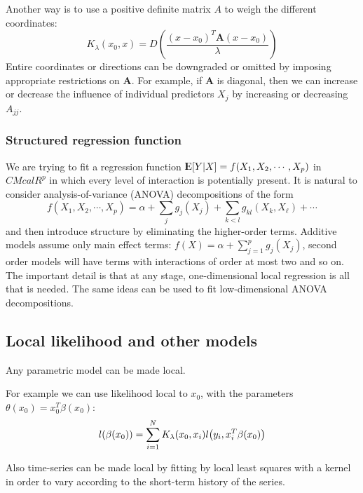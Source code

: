 \documentclass[12pt, letterpaper]{article}
\theoremstyle{definition}
\newcommand{\E}{{\rm I\kern-.3em E}}
\DeclarePairedDelimiter\autobracket{(}{)}
\newcommand{\br}[1]{\autobracket*{#1}}
\begin{document}
Another way is to use a positive definite matrix $A$ to weigh the different coordinates:
\begin{equation}
K_\lambda(x_0, x) = D\left( \frac{(x-x_0)^T\mathbf{A}(x-x_0)}{\lambda}\right)
\end{equation}
Entire coordinates or directions can be downgraded or omitted by imposing appropriate restrictions on $\mathbf{A}$. For example, if $\mathbf{A}$ is diagonal, then we can increase or decrease the influence of individual predictors $X_j$ by increasing or decreasing $A_{jj}$.

\subsubsection{Structured regression function}
We are trying to fit a regression function $\E[Y|X] =f(X_1,X_2, \cdots, X_p)$ in $CMcal{R}^p$ in which every level of interaction is potentially present. It is natural to consider analysis-of-variance (ANOVA) decompositions of the form
\begin{equation}
f(X_1,X_2,\cdots, X_p) = \alpha + \sum_j g_j(X_j) +  \sum_{k<l} g_{kl}(X_k, X_\ell) + \cdots 
\end{equation}
and then introduce structure by eliminating the higher-order terms. Additive models assume only main effect terms: $f(X) = \alpha + \sum_{j=1}^p g_j(X_j)$, second order models will have terms with interactions of order at most two and so on.  The important detail is that at any stage, one-dimensional local regression is all that is needed. The same ideas can be used to fit low-dimensional ANOVA decompositions.

\subsection{Local likelihood and other models}
Any parametric model can be made local.

For example we can use likelihood local to $x_0$,  with the parameters $\theta(x_0) = x_0^T\beta(x_0)$:
\begin{equation}
l\br{\beta(x_0)} = \sum_{i=1}^N K_\lambda (x_0,x_i) l\br{y_i, x_i^T\beta(x_0)}
\end{equation}

Also time-series can be made local by fitting by local least squares with a kernel in order to vary according to the short-term history of the series.
\end{document}
